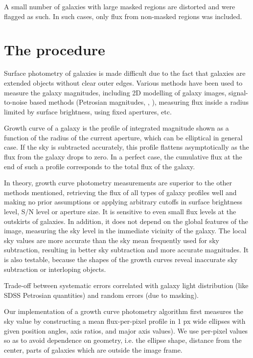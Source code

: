 \documentclass[apj, onecolumn]{emulateapj}
\begin{document}
A small number of galaxies with large masked regions are distorted and were flagged as such. In such cases, only flux from non-masked regions was included.

\section*{The procedure}

Surface photometry of galaxies is made difficult due to the fact that galaxies are extended objects without clear outer edges. Various methods have been used to measure the galaxy magnitudes, including 2D modelling of galaxy images, signal-to-noise based methods (Petrosian magnitudes, \cite{Petrosian1976}, \cite{Strauss2002}), measuring flux inside a radius limited by surface brightness, using fixed apertures, etc.

Growth curve of a galaxy is the profile of integrated magnitude shown as a function of the radius of the current aperture\cite{Okamura1999}, which can be elliptical in general case. If the sky is subtracted accurately, this profile flattens asymptotically as the flux from the galaxy drops to zero. In a perfect case, the cumulative flux at the end of such a profile corresponds to the total flux of the galaxy.

In theory, growth curve photometry measurements are superior to the other methods mentioned, retrieving the flux of all types of galaxy profiles well and making no prior assumptions or applying arbitrary cutoffs in surface brightness level, S/N level or aperture size. It is sensitive to even small flux levels at the outskirts of galaxies. In addition, it does not depend on the global features of the image, measuring the sky level in the immediate vicinity of the galaxy. The local sky values are more accurate than the sky mean frequently used for sky subtraction, resulting in better sky subtraction and more accurate magnitudes. It is also testable, because the shapes of the growth curves reveal inaccurate sky subtraction or interloping objects. 

Trade-off between systematic errors correlated with galaxy light distribution (like SDSS Petrosian quantities) and random errors (due to masking).

Our implementation of a growth curve photometry algorithm first measures the sky value by constructing a mean flux-per-pixel profile in 1 px wide ellipses with given position angles, axis ratios, and major axis values). We use per-pixel values so as to avoid dependence on geometry, i.e. the ellipse shape, distance from the center, parts of galaxies which are outside the image frame.
\end{document}
